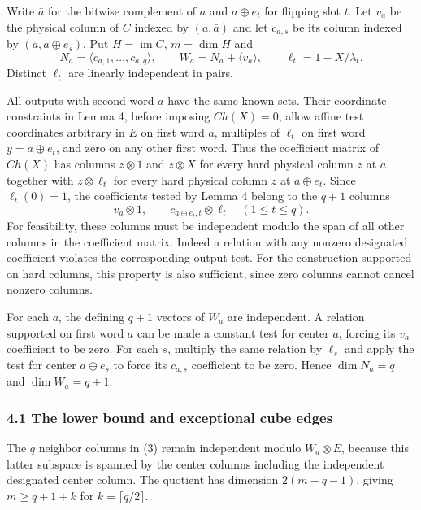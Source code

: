 \documentclass[
  10pt,
]{article}
\begin{document}
Write \(\bar a\) for the bitwise complement of \(a\) and \(a\oplus e_t\)
for flipping slot \(t\). Let \(v_a\) be the physical column of \(C\)
indexed by \((a,\bar a)\) and let \(c_{a,s}\) be its column indexed by
\((a,\bar a\oplus e_s)\). Put \(H=\operatorname{im} C\), \(m=\dim H\)
and \[
 N_a=\langle c_{a,1},\ldots,c_{a,q}\rangle,\qquad
 W_a=N_a+\langle v_a\rangle,\qquad \ell_t=1-X/\lambda_t.
\] Distinct \(\ell_t\) are linearly independent in pairs.

All outputs with second word \(\bar a\) have the same known sets. Their
coordinate constraints in Lemma 4, before imposing \(Ch(X)=0\), allow
affine test coordinates arbitrary in \(E\) on first word \(a\),
multiples of \(\ell_t\) on first word \(y=a\oplus e_t\), and zero on any
other first word. Thus the coefficient matrix of \(Ch(X)\) has columns
\(z\otimes1\) and \(z\otimes X\) for every hard physical column \(z\) at
\(a\), together with \(z\otimes\ell_t\) for every hard physical column
\(z\) at \(a\oplus e_t\). Since \(\ell_t(0)=1\), the coefficients tested
by Lemma 4 belong to the \(q+1\) columns \[
           v_a\otimes1,\qquad
           c_{a\oplus e_t,t}\otimes\ell_t\quad(1\le t\le q).
 \tag{3}
\] For feasibility, these columns must be independent modulo the span of
all other columns in the coefficient matrix. Indeed a relation with any
nonzero designated coefficient violates the corresponding output test.
For the construction supported on hard columns, this property is also
sufficient, since zero columns cannot cancel nonzero columns.

For each \(a\), the defining \(q+1\) vectors of \(W_a\) are independent.
A relation supported on first word \(a\) can be made a constant test for
center \(a\), forcing its \(v_a\) coefficient to be zero. For each
\(s\), multiply the same relation by \(\ell_s\) and apply the test for
center \(a\oplus e_s\) to force its \(c_{a,s}\) coefficient to be zero.
Hence \(\dim N_a=q\) and \(\dim W_a=q+1\).

\subsubsection{4.1 The lower bound and exceptional cube
edges}\label{the-lower-bound-and-exceptional-cube-edges}

The \(q\) neighbor columns in (3) remain independent modulo
\(W_a\otimes E\), because this latter subspace is spanned by the center
columns including the independent designated center column. The quotient
has dimension \(2(m-q-1)\), giving \(m\ge q+1+k\) for
\(k=\lceil q/2\rceil\).
\end{document}
